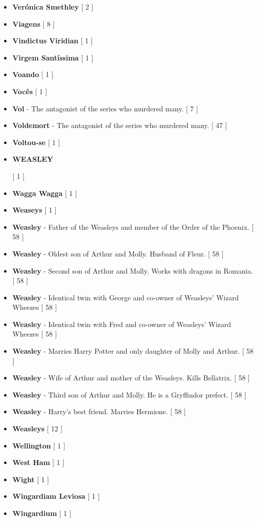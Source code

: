 \documentclass[a4paper]{article}
\begin{document}
{\begin{itemize}
	\item \textbf{Verónica Smethley} [ 2 ]
	\item \textbf{Viagens} [ 8 ]
	\item \textbf{Vindictus Viridian} [ 1 ]
	\item \textbf{Virgem Santíssima} [ 1 ]
	\item \textbf{Voando} [ 1 ]
	\item \textbf{Vocês} [ 1 ]
	\item \textbf{Vol} - The antagonist of the series who murdered many. [ 7 ]
	\item \textbf{Voldemort} - The antagonist of the series who murdered many. [ 47 ]
	\item \textbf{Voltou-se} [ 1 ]
	\item \hypertarget{W}{\textbf{WEASLEY}} [ 1 ]
	\item \textbf{Wagga Wagga} [ 1 ]
	\item \textbf{Weaseys} [ 1 ]
	\item \textbf{Weasley} - Father of the Weasleys and member of the Order of the Phoenix. [ 58 ]
	\item \textbf{Weasley} - Oldest son of Arthur and Molly. Husband of Fleur.  [ 58 ]
	\item \textbf{Weasley} - Second son of Arthur and Molly. Works with dragons in Romania. [ 58 ]
	\item \textbf{Weasley} - Identical twin with George and co-owner of Weasleys' Wizard Wheezes [ 58 ]
	\item \textbf{Weasley} - Identical twin with Fred and co-owner of Weasleys' Wizard Wheezes [ 58 ]
	\item \textbf{Weasley} - Marries Harry Potter and only daughter of Molly and Arthur. [ 58 ]
	\item \textbf{Weasley} - Wife of Arthur and mother of the Weasleys. Kills Bellatrix. [ 58 ]
	\item \textbf{Weasley} - Third son of Arthur and Molly. He is a Gryffindor prefect. [ 58 ]
	\item \textbf{Weasley} - Harry's best friend. Marries Hermione. [ 58 ]
	\item \textbf{Weasleys} [ 12 ]
	\item \textbf{Wellington} [ 1 ]
	\item \textbf{West Ham} [ 1 ]
	\item \textbf{Wight} [ 1 ]
	\item \textbf{Wingardiam Leviosa} [ 1 ]
	\item \textbf{Wingardium} [ 1 ]

\end{itemize}}
\end{document}
